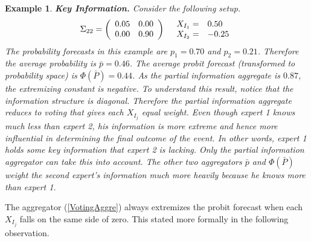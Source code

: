 \documentclass[11pt,twoside]{article}
\newtheorem{example}[theorem]{Example}
\begin{document}
\begin{example}
\textbf{Key Information.} Consider the following setup.
\begin{align*}
\Sigma_{22} =  \left(\begin{array}{c c}
0.05 & 0.00\\
0.00 & 0.90 \\
 \end{array}\right)
  && 
  \begin{array}{l l}
X_{I_1} =& 0.50\\
X_{I_2} =& -0.25
 \end{array}
\end{align*}
The probability forecasts in this example are $p_1 = 0.70$ and $p_2 = 0.21$.  Therefore the average probability is $\bar{p} = 0.46$. The average probit forecast (transformed to probability space) is $\Phi(\bar{P}) = 0.44$.  As the partial information aggregate is $0.87$,  the extremizing constant is negative. To understand this result, notice that the information structure is diagonal. Therefore the partial information aggregate reduces to voting that gives each $X_{I_j}$ equal weight. Even though expert 1 knows much less than expert 2, his information is more extreme and hence more influential in determining the final outcome of the event. In other words, expert 1 holds some key information that expert 2 is lacking. Only the partial information aggregator can take this into account. The other two aggregators $\bar{p}$ and $\Phi(\bar{P})$ weight the second expert's information much more heavily because he knows more than expert 1.

\end{example}

 The aggregator (\ref{VotingAggre}) always extremizes the probit forecast when each $X_{I_j}$ falls on the same side of zero. This stated more formally in the following observation.
 
\end{document}
